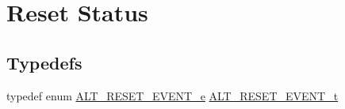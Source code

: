 \hypertarget{group__RST__MGR__STATUS}{}\section{Reset Status}
\label{group__RST__MGR__STATUS}
\subsection*{Typedefs}
\begin{DoxyCompactItemize}
\item 
typedef enum \mbox{\hyperlink{group__RST__MGR__STATUS_gaec1a3a92fb6ca1987fb805679ebae4ef}{A\+L\+T\+\_\+\+R\+E\+S\+E\+T\+\_\+\+E\+V\+E\+N\+T\+\_\+e}} \mbox{\hyperlink{group__RST__MGR__STATUS_ga102726c685d2fd0c3cf94ae652977931}{A\+L\+T\+\_\+\+R\+E\+S\+E\+T\+\_\+\+E\+V\+E\+N\+T\+\_\+t}}
\end{DoxyCompactItemize}
